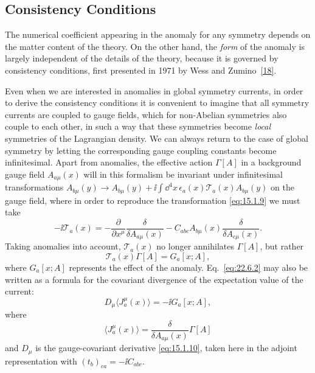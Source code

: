 \subsection{Consistency Conditions}
\label{sec:22.6}

The numerical coefficient appearing in the anomaly for any symmetry
depends on the matter content of the theory. On the other hand, the
\emph{form} of the anomaly is largely independent of the details of the
theory, because it is governed by consistency conditions, first presented
in 1971 by Wess and Zumino~\hyperref[ch22-ref-18]{[18]}.

Even when we are interested in anomalies in global symmetry currents, in
order to derive the consistency conditions it is convenient to imagine
that all symmetry currents are coupled to gauge fields, which for
non-Abelian symmetries also couple to each other, in such a way that these
symmetries become \emph{local} symmetries of the Lagrangian density. We can
always return to the case of global symmetry by letting the corresponding
gauge coupling constants become infinitesimal. Apart from anomalies, the
effective action $\Gamma[A]$ in a background gauge field
$A_{a\mu}(x)$ will in this formalism be invariant under infinitesimal
transformations
$A_{b\mu}(y)\rightarrow A_{b\mu}(y)
+\ii\int \dd^4x\,\epsilon_a(x)\mathcal T_a(x)A_{b\mu}(y)$
on the gauge field, where in order to reproduce the transformation
\eqref{eq:15.1.9} we must take
\begin{equation}
 -\ii\mathcal T_a(x)
 =-\frac{\partial}{\partial x^\mu}
 \frac{\delta}{\delta A_{a\mu}(x)}
 -C_{abc}A_{b\mu}(x)
 \frac{\delta}{\delta A_{c\mu}(x)}.
 \tag{22.6.1}\label{eq:22.6.1}
\end{equation}
Taking anomalies into account, $\mathcal T_a(x)$ no longer annihilates
$\Gamma[A]$, but rather
\begin{equation}
 \mathcal T_a(x)\Gamma[A]=G_a[x;A],
 \tag{22.6.2}\label{eq:22.6.2}
\end{equation}
where $G_a[x;A]$ represents the effect of the anomaly.
Eq.~\eqref{eq:22.6.2} may also be written as a formula for the covariant
divergence of the expectation value of the current:
\begin{equation}
 D_\mu\langle J^\mu_a(x)\rangle=-\ii G_a[x;A],
 \tag{22.6.3}\label{eq:22.6.3}
\end{equation}
where
\begin{equation}
 \langle J^\mu_a(x)\rangle
 =\frac{\delta}{\delta A_{a\mu}(x)}\Gamma[A]
 \tag{22.6.4}\label{eq:22.6.4}
\end{equation}
and $D_\mu$ is the gauge-covariant derivative \eqref{eq:15.1.10}, taken
here in the adjoint representation with
$(t_b)_{ca}=-\ii C_{abc}$.

